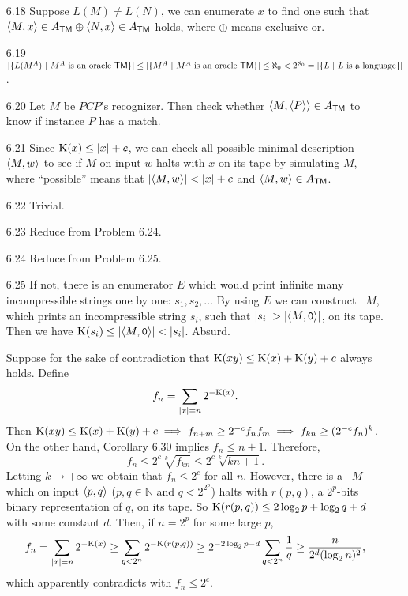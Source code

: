 \begin{itemize}
	\item[6.18]
	Suppose $L(M) \neq L(N)$, we can enumerate $x$ to find one such that $\Bra{M, x} \in A_{\TM} \oplus \Bra{N, x} \in A_{\TM}$ holds, where $\oplus$ means exclusive or.
	
	\item[6.19]
	$ |\{ L(M^A) \ | \ \text{$M^A$ is an oracle \TM} \}| \leq |\{ M^A \ | \ \text{$M^A$ is an oracle \TM} \}| \leq \aleph_0 < 2^{\aleph_0} = |\{ L \ | \ \text{$L$ is a language} \}|$.
	
	\item[6.20]
	Let $M$ be $PCP$'s recognizer. Then check whether $\Bra{M, \Bra{P}} \in A_{\TM}$ to know if instance $P$ has a match.
	
	\item[6.21]
	Since $\K(x) \leq |x| + c$, we can check all possible minimal description $\Bra{M, w}$ to see if $M$ on input $w$ halts with $x$ on its tape by simulating $M$, where ``possible'' means that $|\Bra{M, w}| < |x| + c$ and $\Bra{M, w} \in A_{\TM}$.
	
	\item[6.22]
	Trivial.
	
	\item[6.23]
	Reduce from Problem 6.24.
	
	\item[6.24]
	Reduce from Problem 6.25.
	
	\item[6.25]
	If not, there is an enumerator $E$ which would print infinite many incompressible strings one by one: $s_1, s_2, \dots$ By using $E$ we can construct \TM\ $M$, which prints an incompressible string $s_i$, such that $|s_i| > |\Bra{M, \TT{0}}|$, on its tape. Then we have $\K(s_i) \leq |\Bra{M, \TT{0}}| < |s_i|$. Absurd.
	
	\item[\Star 6.26] 
	Suppose for the sake of contradiction that $\K(xy) \leq \K(x) + \K(y) + c$ always holds. Define
	$$
		f_n = \sum_{|x|=n} {2^{-\K(x)}}.
	$$
	Then $\K(xy) \leq \K(x) + \K(y) + c \implies f_{n+m} \geq 2^{-c} f_n f_m \implies f_{k n} \geq (2^{-c} f_n)^{k}$. On the other hand, Corollary 6.30 implies $f_n \leq n + 1$. Therefore, 
	$$
		f_n \leq 2^c \sqrt[k]{f_{k n}} \leq 2^c \sqrt[k]{kn + 1}.
	$$
	Letting $k \to +\infty$ we obtain that $f_n \leq 2^c$ for all $n$. However, there is a \TM\ $M$ which on input $\Bra{p, q}$ ($p, q \in \mathbb{N}$ and $q < 2^{2^p}$) halts with $r(p,q)$, a $2^p$-bits binary representation of $q$, on its tape. So $\K(r(p,q)) \leq 2 \log_2 p + \log_2 q + d$ with some constant $d$. Then, if $n = 2^p$ for some large $p$,
	$$
		f_{n} = \sum_{|x|=n} {2^{-\K(x)}} \geq \sum_{q < 2^n} {2^{-\K(r(p,q))}} \geq 2^{-2 \log_2 p - d} \sum_{q < 2^n} \frac{1}{q} \geq \frac{n}{2^d (\log_2 n)^2},
	$$
	which apparently contradicts with $f_n \leq 2^c$.
	

\end{itemize}
